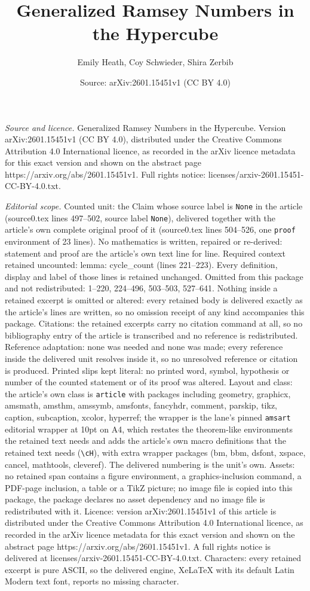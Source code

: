 \documentclass[10pt,a4paper]{amsart}
\title[Generalized Ramsey Numbers in the Hypercube]{Generalized Ramsey Numbers in the Hypercube}
\author{Emily Heath, Coy Schwieder, Shira Zerbib}
\date{Source: arXiv:2601.15451v1 (CC BY 4.0)}
\begin{document}
\maketitle

\noindent\emph{Source and licence.} Generalized Ramsey Numbers in the Hypercube. Version arXiv:2601.15451v1 (CC BY 4.0), distributed under the Creative Commons Attribution 4.0 International licence, as recorded in the arXiv licence metadata for this exact version and shown on the abstract page https://arxiv.org/abs/2601.15451v1. Full rights notice: licenses/arxiv-2601.15451-CC-BY-4.0.txt.\par\smallskip

\noindent\textit{Editorial scope.} Counted unit: the Claim whose source label is \texttt{None} in the article (source0.tex lines 497--502, source label \texttt{None}), delivered together with the article's own complete original proof of it (source0.tex lines 504--526, one \texttt{proof} environment of 23 lines). No mathematics is written, repaired or re-derived: statement and proof are the article's own text line for line. Required context retained uncounted: lemma: cycle\_count (lines 221--223). Every definition, display and label of those lines is retained unchanged. Omitted from this package and not redistributed: 1--220, 224--496, 503--503, 527--641. Nothing inside a retained excerpt is omitted or altered: every retained body is delivered exactly as the article's lines are written, so no omission receipt of any kind accompanies this package. Citations: the retained excerpts carry no citation command at all, so no bibliography entry of the article is transcribed and no reference is redistributed. Reference adaptation: none was needed and none was made; every reference inside the delivered unit resolves inside it, so no unresolved reference or citation is produced. Printed slips kept literal: no printed word, symbol, hypothesis or number of the counted statement or of its proof was altered. Layout and class: the article's own class is \texttt{article} with packages including geometry, graphicx, amsmath, amsthm, amssymb, amsfonts, fancyhdr, comment, parskip, tikz, caption, subcaption, xcolor, hyperref; the wrapper is the lane's pinned \texttt{amsart} editorial wrapper at 10pt on A4, which restates the theorem-like environments the retained text needs and adds the article's own macro definitions that the retained text needs (\texttt{\textbackslash cH}), with extra wrapper packages (bm, bbm, dsfont, xspace, cancel, mathtools, cleveref). The delivered numbering is the unit's own. Assets: no retained span contains a figure environment, a graphics-inclusion command, a PDF-page inclusion, a table or a TikZ picture; no image file is copied into this package, the package declares no asset dependency and no image file is redistributed with it. Licence: version arXiv:2601.15451v1 of this article is distributed under the Creative Commons Attribution 4.0 International licence, as recorded in the arXiv licence metadata for this exact version and shown on the abstract page https://arxiv.org/abs/2601.15451v1. A full rights notice is delivered at licenses/arxiv-2601.15451-CC-BY-4.0.txt. Characters: every retained excerpt is pure ASCII, so the delivered engine, XeLaTeX with its default Latin Modern text font, reports no missing character.
\end{document}
